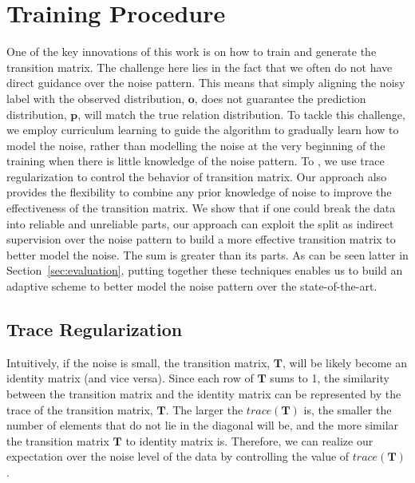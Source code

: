 \section{Training Procedure \label{sec:training}}
One of the key innovations of this work is on how to train and generate the
transition matrix. The challenge here lies in the fact that we often do not
have direct guidance over the noise pattern. This means that simply aligning
the noisy label with the observed distribution, $\mathbf{o}$, does not
guarantee the prediction distribution, $\mathbf{p}$, will match the true
relation distribution. To tackle this challenge, we employ curriculum
learning to guide the algorithm to gradually learn how to model the noise,
rather than modelling the noise at the very beginning of the training when
there is little knowledge of the noise pattern. To , we use  trace regularization
to control the behavior of transition matrix. Our approach also provides the
flexibility to combine any prior knowledge of noise to improve the
effectiveness of  the transition matrix. We show that if one could break the
data into reliable and unreliable parts, our approach can exploit the split
as indirect supervision over the noise pattern to build a more effective
transition matrix to better model the noise. The sum is greater than its
parts. As can be seen latter in Section~\ref{sec:evaluation}, putting
together these techniques
enables us to build an adaptive scheme to better model the noise pattern over the state-of-the-art. 



\subsection{Trace Regularization}
Intuitively, if the noise is small, the transition matrix, $\mathbf{T}$, will be likely become an identity matrix (and vice versa).  Since each row of $\mathbf{T}$ sums to 1, the similarity between the transition matrix and the identity matrix  can be represented by the trace of the transition matrix, $\mathbf{T}$. The larger the $trace(\mathbf{T})$ is, the smaller the number of elements that do not lie in the diagonal will be, and the more similar the transition matrix $\mathbf{T}$ to identity matrix is. Therefore, we can realize our expectation over the noise level of the data by controlling the value of $trace(\mathbf{T})$. 

